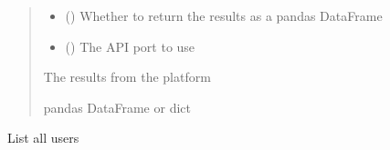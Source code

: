 \documentclass[letterpaper,10pt,english]{sphinxmanual}
\begin{document}
\begin{fulllineitems}
\begin{fulllineitems}
\begin{quote}
\begin{description}
\begin{itemize}
\item {} 
\sphinxAtStartPar
{} (\sphinxstyleliteralemphasis{\sphinxupquote{ (}}\sphinxstyleliteralemphasis{\sphinxupquote{)}}) \textendash{} Whether to return the results as a pandas DataFrame

\item {} 
\sphinxAtStartPar
{} (\sphinxstyleliteralemphasis{\sphinxupquote{ (}}\sphinxstyleliteralemphasis{\sphinxupquote{)}}) \textendash{} The API port to use

\end{itemize}

\sphinxAtStartPar
{} \textendash{} The results from the platform

\sphinxAtStartPar
pandas DataFrame or dict

\end{description}\end{quote}

\end{fulllineitems}


\begin{fulllineitems}
\label{\detokenize{aisquared.platform:aisquared.platform.AISquaredPlatformClient.AISquaredPlatformClient.list_users}}
\pysigstartsignatures
{}
\pysigstopsignatures
\sphinxAtStartPar
List all users


\end{fulllineitems}
\end{fulllineitems}
\end{document}
